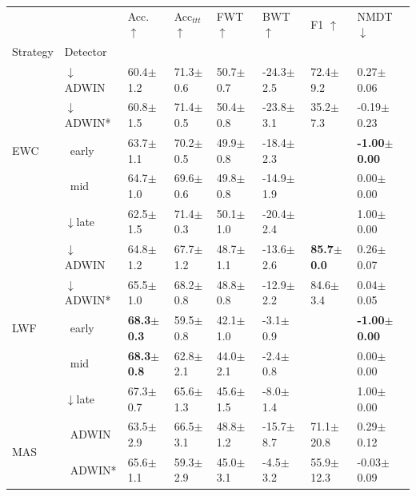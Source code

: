 \begin{tabular}{llllllll}
\toprule
 &  & Acc. $\uparrow$ & Acc$_{ttt}$ $\uparrow$ & FWT $\uparrow$ & BWT $\uparrow$ & F1 $\uparrow$ & NMDT $\downarrow$ \\
Strategy & Detector &  &  &  &  &  &  \\
\midrule
\multirow[t]{5}{*}{EWC} & $\downarrow$ADWIN & 60.4\tiny{$\pm$1.2} & 71.3\tiny{$\pm$0.6} & 50.7\tiny{$\pm$0.7} & -24.3\tiny{$\pm$2.5} & 72.4\tiny{$\pm$9.2} & 0.27\tiny{$\pm$0.06} \\
 & $\downarrow$ADWIN* & 60.8\tiny{$\pm$1.5} & 71.4\tiny{$\pm$0.5} & 50.4\tiny{$\pm$0.8} & -23.8\tiny{$\pm$3.1} & 35.2\tiny{$\pm$7.3} & -0.19\tiny{$\pm$0.23} \\
 & $\ \;$early & 63.7\tiny{$\pm$1.1} & 70.2\tiny{$\pm$0.5} & 49.9\tiny{$\pm$0.8} & -18.4\tiny{$\pm$2.3} &  & \textbf{-1.00\tiny{$\pm$0.00}} \\
 & $\ \;$mid & 64.7\tiny{$\pm$1.0} & 69.6\tiny{$\pm$0.6} & 49.8\tiny{$\pm$0.8} & -14.9\tiny{$\pm$1.9} &  & 0.00\tiny{$\pm$0.00} \\
 & $\downarrow$late & 62.5\tiny{$\pm$1.5} & 71.4\tiny{$\pm$0.3} & 50.1\tiny{$\pm$1.0} & -20.4\tiny{$\pm$2.4} &  & 1.00\tiny{$\pm$0.00} \\
\midrule
\multirow[t]{5}{*}{LWF} & $\downarrow$ADWIN & 64.8\tiny{$\pm$1.2} & 67.7\tiny{$\pm$1.2} & 48.7\tiny{$\pm$1.1} & -13.6\tiny{$\pm$2.6} & \textbf{85.7\tiny{$\pm$0.0}} & 0.26\tiny{$\pm$0.07} \\
 & $\downarrow$ADWIN* & 65.5\tiny{$\pm$1.0} & 68.2\tiny{$\pm$0.8} & 48.8\tiny{$\pm$0.8} & -12.9\tiny{$\pm$2.2} & 84.6\tiny{$\pm$3.4} & 0.04\tiny{$\pm$0.05} \\
 & $\ \;$early & \textbf{68.3\tiny{$\pm$0.3}} & 59.5\tiny{$\pm$0.8} & 42.1\tiny{$\pm$1.0} & -3.1\tiny{$\pm$0.9} &  & \textbf{-1.00\tiny{$\pm$0.00}} \\
 & $\ \;$mid & \textbf{68.3\tiny{$\pm$0.8}} & 62.8\tiny{$\pm$2.1} & 44.0\tiny{$\pm$2.1} & -2.4\tiny{$\pm$0.8} &  & 0.00\tiny{$\pm$0.00} \\
 & $\downarrow$late & 67.3\tiny{$\pm$0.7} & 65.6\tiny{$\pm$1.3} & 45.6\tiny{$\pm$1.5} & -8.0\tiny{$\pm$1.4} &  & 1.00\tiny{$\pm$0.00} \\
\midrule
\multirow[t]{5}{*}{MAS} & $\ \;$ADWIN & 63.5\tiny{$\pm$2.9} & 66.5\tiny{$\pm$3.1} & 48.8\tiny{$\pm$1.2} & -15.7\tiny{$\pm$8.7} & 71.1\tiny{$\pm$20.8} & 0.29\tiny{$\pm$0.12} \\
 & $\ \;$ADWIN* & 65.6\tiny{$\pm$1.1} & 59.3\tiny{$\pm$2.9} & 45.0\tiny{$\pm$3.1} & -4.5\tiny{$\pm$3.2} & 55.9\tiny{$\pm$12.3} & -0.03\tiny{$\pm$0.09} \\

\end{tabular}
